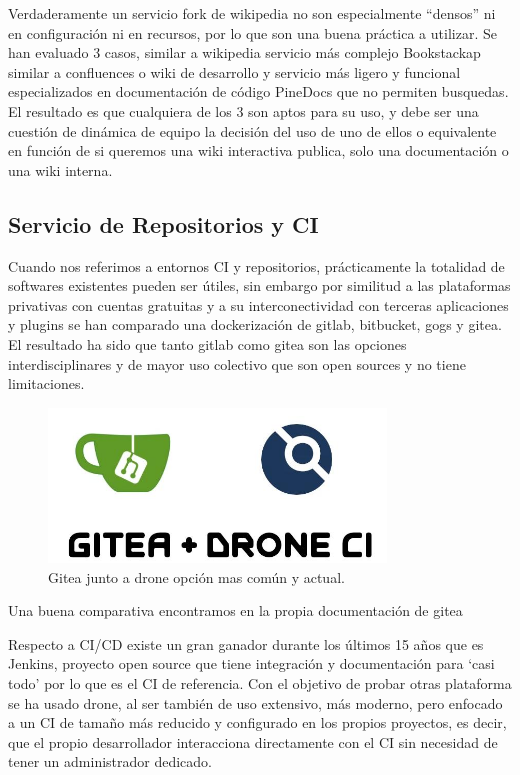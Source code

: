 Verdaderamente un servicio fork de wikipedia no son especialmente “densos” ni en configuración ni en recursos, por lo que son una buena práctica a utilizar. Se han evaluado 3 casos, similar a wikipedia\cite{c_media_wiki} servicio más complejo Bookstackap\cite{c_bookstack} similar a confluences o wiki de desarrollo y servicio más ligero y funcional especializados en documentación de código PineDocs\cite{c_pinedocs} que no permiten busquedas. El resultado es que cualquiera de los 3 son aptos para su uso, y debe ser una cuestión de dinámica de equipo la decisión del uso de uno de ellos o equivalente en función de si queremos una wiki interactiva publica, solo una documentación o una wiki interna.

\subsection{Servicio de Repositorios y CI}
Cuando nos referimos a entornos CI y repositorios, prácticamente la totalidad de softwares existentes pueden ser útiles, sin embargo por similitud a las plataformas privativas con cuentas gratuitas y a su interconectividad con terceras aplicaciones y plugins se han comparado una dockerización de gitlab\cite{c_gitlab}, bitbucket\cite{c_bitbucket}, gogs\cite{c_gogs} y gitea\cite{c_gitea}. El resultado ha sido que tanto gitlab como gitea son las opciones interdisciplinares y de mayor uso colectivo que son open sources y no tiene limitaciones.

\begin{figure}[!htb]
\begin{center}
\includegraphics[width=0.8\textwidth]{./figuras/ci.jpg}
\caption{Gitea junto a drone opción mas común y actual.}
\label{F:ci}
\end{center}
\end{figure}
Una buena comparativa encontramos en la propia documentación de gitea \cite{c_gitea_comparation}

Respecto a CI/CD existe un gran ganador durante los últimos 15 años que es Jenkins\cite{c_jenkins}, proyecto open source que tiene integración y documentación para ‘casi todo’ por lo que es el CI de referencia. Con el objetivo de probar otras plataforma se ha usado drone\cite{c_drone}, al ser también de uso extensivo, más moderno, pero enfocado a un CI de tamaño más reducido y configurado en los propios proyectos, es decir, que el propio desarrollador interacciona directamente con el CI sin necesidad de tener un administrador dedicado.


